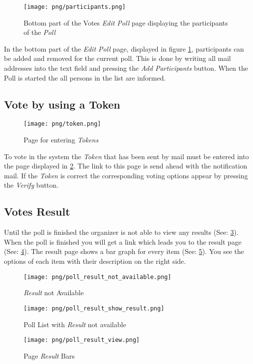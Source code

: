 \begin{figure}
\centering
\texttt{[image: png/participants.png]}
\caption{Bottom part of the Votes \textit{Edit Poll} page displaying the participants of the \textit{Poll}}
\label{F:participants}
\end{figure}

In the bottom part of the \textit{Edit Poll} page, displayed in figure \ref*{F:participants}, participants can be added and removed for the current poll. This is done by writing all mail addresses into the text field and pressing the \textit{Add Participants} button. When the Poll is started the all persons in the list are informed.

\subsection{Vote by using a Token}

\begin{figure}
\centering
\texttt{[image: png/token.png]}
\caption{Page for entering \textit{Tokens}}
\label{F:token}
\end{figure}

To vote in the system the \textit{Token} that has been sent by mail must be entered into the page displayed in \ref{F:token}. The link to this page is send ahead with the notification mail. If the \textit{Token} is correct the corresponding voting options appear by pressing the \textit{Verify} button.

\subsection{Votes Result}

Until the poll is finished the organizer is not able to view any results (See: \ref{F:not_available}).
When the poll is finished you will get a link which leads you to the result page (See: \ref{F:show_result}).
The result page shows a bar graph for every item (See: \ref{F:result_bars}). You see the options of each item with their description on the right side.

\begin{figure}
\centering
\texttt{[image: png/poll\_result\_not\_available.png]}
\caption{\textit{Result} not Available }
\label{F:not_available}
\end{figure}


\begin{figure}
\centering
\texttt{[image: png/poll\_result\_show\_result.png]}
\caption{Poll List with \textit{Result} not available}
\label{F:show_result}
\end{figure}


\begin{figure}
\centering
\texttt{[image: png/poll\_result\_view.png]}
\caption{Page \textit{Result} Bars}
\label{F:result_bars}
\end{figure}









